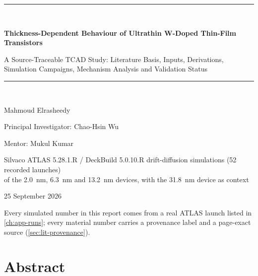 \documentclass[11pt,oneside,openany]{report}
\newcommand{\reporttitle}{Thickness-Dependent Behaviour of Ultrathin W-Doped \InO{} Thin-Film Transistors}
\newcommand{\reportsubtitle}{A Source-Traceable TCAD Study: Literature Basis, Inputs, Derivations, Simulation Campaigns, Mechanism Analysis and Validation Status}
\newcommand{\reportauthor}{Mahmoud Elrasheedy}
\newcommand{\reportsupervisor}{Chao-Hsin Wu}
\newcommand{\reportdate}{25 September 2026}
\begin{document}
\begin{titlepage}
  \centering
  \vspace*{2.5cm}
  \rule{\linewidth}{0.6pt}\\[0.8cm]
  {\LARGE\bfseries \reporttitle\par}
  \vspace{0.5cm}
  {\large \reportsubtitle\par}
  \vspace{0.6cm}
  \rule{\linewidth}{0.6pt}\\[1.6cm]
  {\large \reportauthor\par}
  \vspace{0.3cm}
  {\normalsize Principal Investigator: \reportsupervisor\par}
  \vspace{0.2cm}
  {\normalsize Mentor: Mukul Kumar\par}
  \vspace{1.2cm}
  {\normalsize Silvaco ATLAS 5.28.1.R / DeckBuild 5.0.10.R drift-diffusion simulations (52 recorded launches)\\
   of the \SI{2.0}{nm}, \SI{6.3}{nm} and \SI{13.2}{nm} devices, with the \SI{31.8}{nm} device as context\par}
  \vfill
  {\normalsize \reportdate\par}
  \vspace{0.4cm}
  {\small Every simulated number in this report comes from a real ATLAS launch listed in \cref{ch:app-runs};
   every material number carries a provenance label and a page-exact source (\cref{sec:lit-provenance}).\par}
\end{titlepage}

\chapter*{Abstract}


\tableofcontents
\listoffigures
\listoftables


\cleardoublepage
{}


















\end{document}
